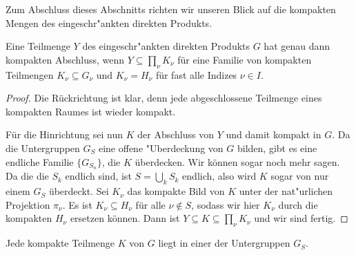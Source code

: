 		Zum Abschluss dieses Abschnitts richten wir unseren Blick auf die kompakten Mengen des eingeschr"ankten direkten Produkts.
		\begin{satz}%
			Eine Teilmenge $Y$ des eingeschr"ankten direkten Produkts $G$ hat genau dann kompakten Abschluss, wenn $Y \subseteq \prod_\nu{K_\nu}$ für eine Familie von kompakten Teilmengen $K_\nu \subseteq G_\nu$ und $K_\nu = H_\nu$ für fast alle Indizes $\nu\in I$.
		\end{satz}
		\begin{proof}
			Die Rückrichtung ist klar, denn jede abgeschlossene Teilmenge eines kompakten Raumes ist wieder kompakt. 

			Für die Hinrichtung sei nun $K$ der Abschluss von $Y$ und damit kompakt in $G$. 
			Da die Untergruppen $G_S$ eine offene "Uberdeckung von $G$ bilden, gibt es eine endliche Familie $\{G_{S_n}\}$, die $K$ überdecken. 
			Wir können sogar noch mehr sagen. 
			Da die die $S_k$ endlich sind, ist $S = \bigcup_k S_k$ endlich, also wird $K$ sogar von nur einem $G_S$ überdeckt. 
			Sei $K_\nu$ das kompakte Bild von $K$ unter der nat"urlichen Projektion $\pi_\nu$. 
			Es ist $K_\nu \subseteq H_\nu$ für alle $\nu\notin S$, sodass wir hier $K_\nu$ durch die kompakten $H_\nu$ ersetzen können. 
			Dann ist $Y\subseteq K \subseteq \prod_\nu{K_\nu}$ und wir sind fertig.
		\end{proof}
		\begin{korollar}
			Jede kompakte Teilmenge $K$ von $G$ liegt in einer der Untergruppen $G_S$.
		\end{korollar}
 

